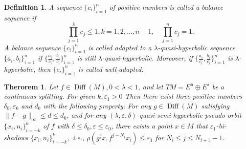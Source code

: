 \documentclass[12pt]{article}
\newtheorem{theorem}{Therorem}[section]
\newtheorem{definition}{Definition}[section]
\begin{document}
\begin{definition}
	\setlength{\emergencystretch}{5em}
	\hfuzz=20pt
	\overfullrule=0pt
	A sequence  $\{c_{i}\}_{i=1}^{n}  $ of positive numbers is called  a balance sequence if
	\begin{equation*}
	\quad \prod_{j=1}^{k} c_{j}\leqslant 1, k=1,2,...,n-1,\quad \prod_{j=1}^{n} c_{j}=1.	\end{equation*}
	A balance sequence $\{c_{i}\}_{i=1}^{n}  $ is called adapted to a $ \lambda$-quasi-hyperbolic sequence $ \{a_{i},b_{i}\}_{i=1}^{n}  $  if $\{\frac{a_{i}}{c_{i}},\frac{b_{i}}{c_{i}}\}_{i=1}^{n}  $ is still $ \lambda $-quasi-hyperbolic. Moreover, if $\{\frac{a_{i}}{c_{i}},\frac{b_{i}}{c_{i}}\}_{i=1}^{n}  $ is $ \lambda $-hyperbolic, then $\{c_{i}\}_{i=1}^{n}  $ is called well-adapted.
\end{definition}

\begin{theorem}\label{th:3.1}
Let $f \in \operatorname{Diff}(M),0 < \lambda < 1 $, and let $TM=E^u \oplus E^s$ be a continuous splitting. For given $ k,\varepsilon_1>0 $ Then there exist three positive numbers   $\delta_0, \varepsilon_0$ and $d_0$ with the following property: For any $g \in \operatorname{Diff}(M)$ satisfying $ \|f - g\|_\infty\leqslant d \leqslant d_0 $​, and for any  $(\lambda,\varepsilon,\delta)$-quasi-semi hyperbolic pseudo-orbit $  \{x_{i},n_{i}\}_{i=-k}^{k} $ of $ f $ with $ \delta\leqslant\delta_0,\varepsilon\leqslant\varepsilon_0 $, there exists a point $ x\in M $ that $\varepsilon_1 $-bi-shadows $ \{x_{i},n_{i}\}_{i=-k}^{k}, $ i.e., $ \rho(g^j x,f^{j-N_{i}}x_{i})\leqslant\varepsilon_1 $ for $ N_{i}\leqslant j\leqslant N_{i+1}-1 $.
\end{theorem}
\vspace{1em}
\end{document}
